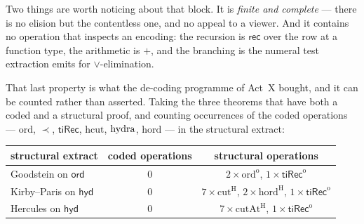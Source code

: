 \documentclass[11pt]{article}
\begin{document}
\begin{center}
\end{center}

\noindent
Two things are worth noticing about that block. It is \emph{finite and
complete} --- there is no elision but the contentless one, and no appeal to a
viewer. And it contains no operation that inspects an encoding: the recursion
is $\mathsf{rec}$ over the row at a function type, the arithmetic is $+$, and
the branching is the numeral test extraction emits for $\lor$-elimination.

That last property is what the de-coding programme of Act~X bought, and it can
be counted rather than asserted. Taking the three theorems that have both a
coded and a structural proof, and counting occurrences of the coded operations
--- $\mathrm{ord}$, $\prec$, $\mathsf{tiRec}$, $\mathrm{hcut}$, $\operatorname{hydra}$,
$\mathrm{hord}$ --- in the structural extract:

\begin{center}\small
\begin{tabular}{@{}lcc@{}}
\toprule
structural extract & coded operations & structural operations\\
\midrule
Goodstein on $\mathsf{ord}$ & $0$ & $2\times\mathrm{ord}^{\mathrm{o}}$, $1\times\mathsf{tiRec}^{\mathrm{o}}$\\
Kirby--Paris on $\mathsf{hyd}$ & $0$ & $7\times\mathrm{cut}^{\mathrm{H}}$, $2\times\mathrm{hord}^{\mathrm{H}}$, $1\times\mathsf{tiRec}^{\mathrm{o}}$\\
Hercules on $\mathsf{hyd}$ & $0$ & $7\times\mathrm{cutAt}^{\mathrm{H}}$, $1\times\mathsf{tiRec}^{\mathrm{o}}$\\
\bottomrule
\end{tabular}
\end{center}
\end{document}
